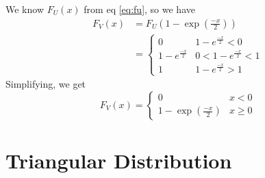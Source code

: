 \documentclass[journal, 12pt, twocolumn]{IEEEtran}
\begin{document}
\begin{enumerate}[label=\arabic{section}.\arabic*]
        We know $F_U(x)$ from eq \eqref{eq:fu}, so we have
        \begin{align}
            F_V(x) &= F_U \left(1 - \exp \left(\frac{-x}{2}\right)\right) \\
            &= \begin{cases}
                0 & 1 - e^{\frac{-x}{2}} < 0 \\
                1 - e^{\frac{-x}{2}} & 0 < 1 - e^{\frac{-x}{2}} < 1 \\
                1 & 1 - e^{\frac{-x}{2}} > 1
            \end{cases}
        \end{align}
        Simplifying, we get
        \begin{equation}
            F_V(x) = \begin{cases}
                0 & x < 0 \\
                1 - \exp \left(\frac{-x}{2}\right) & x \geq 0
            \end{cases}
        \end{equation}
\end{enumerate}

\section{Triangular Distribution}
\end{document}
